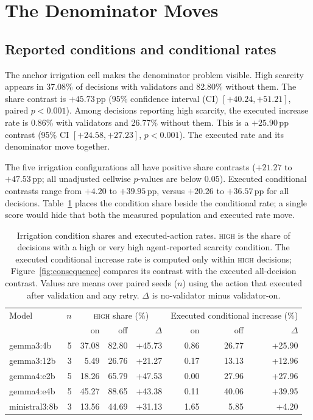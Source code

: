 \documentclass{article}
\newcommand{\high}{\textsc{high}}
\newcommand{\pp}{\,\mathrm{pp}}
\begin{document}
\section{The Denominator Moves}
\label{sec:denominator}

\subsection{Reported conditions and conditional rates}

The anchor irrigation cell makes the denominator problem visible. High scarcity appears in 37.08\% of decisions with validators and 82.80\% without them. The share contrast is $+45.73\pp$ (95\% confidence interval (CI) $[+40.24,+51.21]$, paired $p<0.001$). Among decisions reporting high scarcity, the executed increase rate is 0.86\% with validators and 26.77\% without them. This is a $+25.90\pp$ contrast (95\% CI $[+24.58,+27.23]$, $p<0.001$). The executed rate and its denominator move together.

The five irrigation configurations all have positive share contrasts ($+21.27$ to $+47.53\pp$; all unadjusted cellwise $p$-values are below 0.05). Executed conditional contrasts range from $+4.20$ to $+39.95\pp$, versus $+20.26$ to $+36.57\pp$ for all decisions. Table~\ref{tab:irrigation} places the condition share beside the conditional rate; a single score would hide that both the measured population and executed rate move.
\begin{table}[t]
\caption{Irrigation condition shares and executed-action rates. \high{} is the share of decisions with a high or very high agent-reported scarcity condition. The executed conditional increase rate is computed only within \high{} decisions; Figure~\ref{fig:consequence} compares its contrast with the executed all-decision contrast. Values are means over paired seeds ($n$) using the action that executed after validation and any retry. $\Delta$ is no-validator minus validator-on.}
\label{tab:irrigation}
\centering
\small
\setlength{\tabcolsep}{3.2pt}
\begin{tabular}{lrrrrrrr}
\toprule
Model & $n$ & \multicolumn{3}{c}{\high{} share (\%)} & \multicolumn{3}{c}{Executed conditional increase (\%)}\\
 & & on & off & $\Delta$ & on & off & $\Delta$\\
\midrule
gemma3:4b & 5 & 37.08 & 82.80 & +45.73 & 0.86 & 26.77 & +25.90\\
gemma3:12b & 3 & 5.49 & 26.76 & +21.27 & 0.17 & 13.13 & +12.96\\
gemma4:e2b & 5 & 18.26 & 65.79 & +47.53 & 0.00 & 27.96 & +27.96\\
gemma4:e4b & 5 & 45.27 & 88.65 & +43.38 & 0.11 & 40.06 & +39.95\\
ministral3:8b & 3 & 13.56 & 44.69 & +31.13 & 1.65 & 5.85 & +4.20\\
\bottomrule
\end{tabular}
\end{table}
\end{document}
